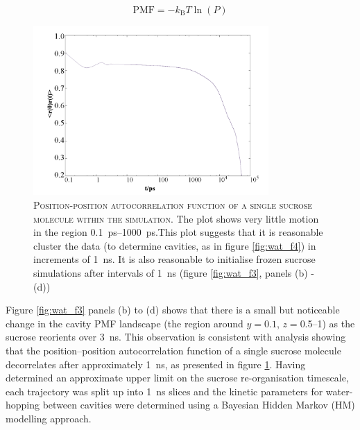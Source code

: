 \begin{equation}\label{eqn:pmf}
\mathrm{PMF}=-k_{\mathrm{B}} T \ln (P)
\end{equation}

\begin{figure}
    \centering
    \includegraphics[width=0.8\textwidth]{chapters/water_hopping/figures/Fig_S8.png}
    \caption[Position-position autocorrelation function of a single sucrose molecule within the simulation]{\textsc{Position-position autocorrelation function of a single sucrose molecule within the simulation}. The plot shows very little motion in the region \SIrange{0.1}{1000}{\pico\second}.This plot suggests that it is reasonable cluster the data (to determine cavities, as in figure \ref{fig:wat_f4}) in increments of \SI{1}{\nano\second}. It is also reasonable to initialise frozen sucrose simulations after intervals of \SI{1}{\nano\second} (figure \ref{fig:wat_f3}, panels (b) - (d))}
    \label{fig:wat_s8}
\end{figure}

Figure \ref{fig:wat_f3} panels (b) to (d) shows that there is a small but noticeable change in the cavity PMF landscape (the region around $y = 0.1$, $z = $\numrange[range-phrase=--]{0.5}{1}) as the sucrose reorients over \SI{3}{\nano\second}. This observation is consistent with analysis showing that the position–position autocorrelation function of a single sucrose molecule decorrelates after approximately \SI{1}{\nano\second}, as presented in figure \ref{fig:wat_s8}.  Having determined an approximate upper limit on the sucrose re-organisation timescale,  each trajectory was split up into \SI{1}{\nano\second} slices and  the kinetic parameters for water-hopping between cavities were determined using a Bayesian Hidden Markov (HM) modelling approach. 

